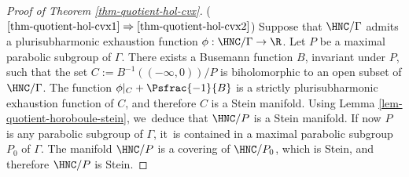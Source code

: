 \skpt
\begin{proof}[Proof of Theorem \ref{thm-quotient-hol-cvx}]
($\eqref{thm-quotient-hol-cvx1}\Rightarrow\eqref{thm-quotient-hol-cvx2}$) Suppose that $\HNC/\Gamma$ admits a plurisubharmonic exhaustion function $\phi:\HNC/\Gamma\to \R$. Let $P$ be a maximal parabolic subgroup of $\Gamma$. There exists a Busemann function $B$, invariant under $P$, such that the set $C:=B^{-1}((-\infty,0))/P$ is biholomorphic to an open subset of $\HNC/\Gamma$. The function $\phi\vert_{ C} + \Psfrac{-1}{B}$ is a strictly plurisubharmonic exhaustion function of $C$, and therefore $C$ is a Stein manifold. Using Lemma \ref{lem-quotient-horoboule-stein}, we~deduce that $\HNC/P$ is a Stein manifold. If now $P$ is any parabolic subgroup of $\Gamma$, it~is contained in a maximal parabolic subgroup $P_0$ of $\Gamma$. The manifold $\HNC/P$ is a covering of $\HNC/P_0$, which is Stein, and therefore $\HNC/P$ is Stein.


\end{proof}
